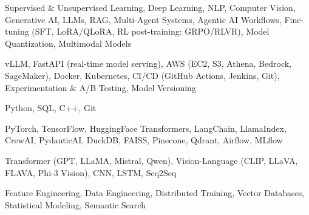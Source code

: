 \documentclass[letter,10pt]{article}
\begin{document}
 Supervised \& Unsupervised Learning, Deep Learning, NLP, Computer Vision, Generative AI, LLMs, RAG, Multi-Agent Systems, Agentic AI Workflows, Fine-tuning (SFT, LoRA/QLoRA, RL post-training: GRPO/RLVR), Model Quantization, Multimodal Models\par\vspace{2pt}

 vLLM, FastAPI (real-time model serving), AWS (EC2, S3, Athena, Bedrock, SageMaker), Docker, Kubernetes, CI/CD (GitHub Actions, Jenkins, Git), Experimentation \& A/B Testing, Model Versioning\par\vspace{2pt}

 Python, SQL, C++, Git\par\vspace{2pt}

 PyTorch, TensorFlow, HuggingFace Transformers, LangChain, LlamaIndex, CrewAI, PydanticAI, DuckDB, FAISS, Pinecone, Qdrant, Airflow, MLflow\par\vspace{2pt}

 Transformer (GPT, LLaMA, Mistral, Qwen), Vision-Language (CLIP, LLaVA, FLAVA, Phi-3 Vision), CNN, LSTM, Seq2Seq\par\vspace{2pt}

 Feature Engineering, Data Engineering, Distributed Training, Vector Databases, Statistical Modeling, Semantic Search
\end{document}
